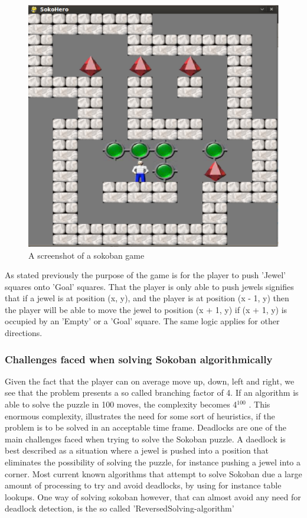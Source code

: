 \begin{figure}[ht]
\centering
\includegraphics[scale=0.25]{images/sokohero.eps}
\caption{A screenshot of a sokoban game}
\label{fig:sokohero}
\end{figure}


As stated previously the purpose of the game is for the player to push 'Jewel' squares onto 'Goal' squares. That the player is only able to push jewels signifies that if a jewel is at position (x, y), and the player is at position (x - 1, y) then the player will be able to move the jewel to position (x + 1, y) if (x + 1, y) is occupied by an 'Empty' or a 'Goal' square. The same logic applies for other directions.
 
\subsubsection{Challenges faced when solving Sokoban algorithmically}
Given the fact that the player can on average move up, down, left and right, we see that the problem presents a so called branching factor of 4. If an algorithm is able to solve the puzzle in 100 moves, the complexity becomes 4$^{100}$ . 
This enormous complexity, illustrates the need for some sort of heuristics, if the problem is to be solved in an acceptable time frame.
Deadlocks are one of the main challenges faced when trying to solve the Sokoban puzzle. A daedlock is best described as a situation where a jewel is pushed into a position that eliminates the possibility of solving the puzzle, for instance pushing a jewel into a corner. Most current known algorithms that attempt to solve Sokoban due a large amount of processing to try and avoid deadlocks, by using for instance table lookups. One way of solving sokoban however, \cite{franktakes} that can almost avoid any need for deadlock detection, is the so called 'ReversedSolving-algorithm'

